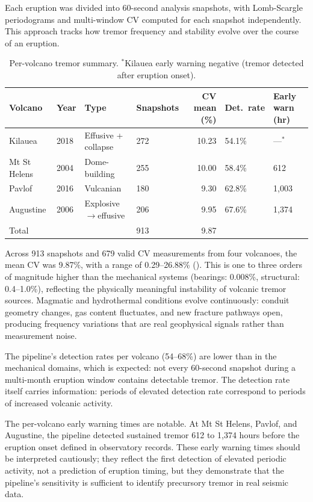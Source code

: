 \documentclass[11pt,a4paper]{article}
\begin{document}
Each eruption was divided into 60-second analysis snapshots, with Lomb-Scargle periodograms and multi-window CV computed for each snapshot independently. This approach tracks how tremor frequency and stability evolve over the course of an eruption.

\begin{table}[htbp]
\centering
\caption{Per-volcano tremor summary. $^*$Kilauea early warning negative (tremor detected after eruption onset).}
\label{tab:volcanic}
\smallskip
\small
\begin{tabular}{llllrll}
\toprule
\textbf{Volcano} & \textbf{Year} & \textbf{Type} & \textbf{Snapshots} & \textbf{CV mean (\%)} & \textbf{Det.\ rate} & \textbf{Early warn (hr)} \\
\midrule
Kilauea       & 2018 & Effusive + collapse  & 272 & 10.23 & 54.1\% & ---$^*$ \\
Mt St Helens  & 2004 & Dome-building        & 255 & 10.00 & 58.4\% & 612 \\
Pavlof        & 2016 & Vulcanian            & 180 &  9.30 & 62.8\% & 1{,}003 \\
Augustine     & 2006 & Explosive$\to$effusive & 206 & 9.95 & 67.6\% & 1{,}374 \\
\midrule
Total         &      &                      & 913 &  9.87 &        & \\
\bottomrule
\end{tabular}
\end{table}

Across 913 snapshots and 679 valid CV measurements from four volcanoes, the mean CV was 9.87\%, with a range of 0.29--26.88\% (). This is one to three orders of magnitude higher than the mechanical systems (bearings: 0.008\%, structural: 0.4--1.0\%), reflecting the physically meaningful instability of volcanic tremor sources. Magmatic and hydrothermal conditions evolve continuously: conduit geometry changes, gas content fluctuates, and new fracture pathways open, producing frequency variations that are real geophysical signals rather than measurement noise.

The pipeline's detection rates per volcano (54--68\%) are lower than in the mechanical domains, which is expected: not every 60-second snapshot during a multi-month eruption window contains detectable tremor. The detection rate itself carries information: periods of elevated detection rate correspond to periods of increased volcanic activity.

The per-volcano early warning times are notable. At Mt St Helens, Pavlof, and Augustine, the pipeline detected sustained tremor 612 to 1{,}374 hours before the eruption onset defined in observatory records. These early warning times should be interpreted cautiously; they reflect the first detection of elevated periodic activity, not a prediction of eruption timing, but they demonstrate that the pipeline's sensitivity is sufficient to identify precursory tremor in real seismic data.
\end{document}
